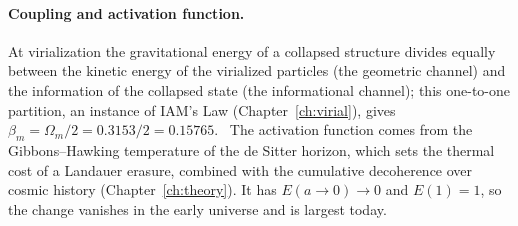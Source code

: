 \paragraph{Coupling and activation function.} At virialization the gravitational energy of a collapsed structure divides equally between the kinetic
energy of the virialized particles (the geometric channel) and the information of the collapsed state (the informational channel); this one-to-one
partition, an instance of IAM's Law (Chapter~\ref{ch:virial}), gives $\beta_m=\Omega_m/2=0.3153/2=0.15765$. \derived\ The activation function comes from
the Gibbons--Hawking temperature of the de Sitter horizon, which sets the thermal cost of a Landauer erasure, combined with the cumulative decoherence
over cosmic history (Chapter~\ref{ch:theory}). It has $E(a\to0)\to0$ and $E(1)=1$, so the change vanishes in the early universe and is largest today.

